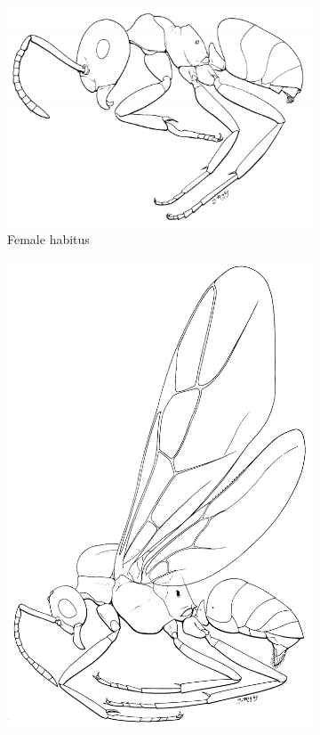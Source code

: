 \documentclass[letterpaper, 11pt]{article}
\begin{document}
\begin{figure}[ht!]
    \centering
    \begin{subfigure}[ht!]{0.42\textwidth}
        \includegraphics[width=\textwidth]{FemaleFormicidHabitus}
        \caption{Female habitus \citep[][Fig. 91]{goulet1993hymenoptera}}
        \label{fig:formicid1}
    \end{subfigure}
    \qquad
    \begin{subfigure}[ht!]{0.35\textwidth}
        \includegraphics[width=\textwidth]{MaleFormicidHabitus}

\end{subfigure}
\end{figure}
\end{document}

